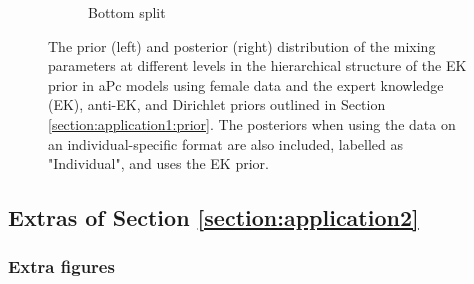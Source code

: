 \begin{figure}[h]
\begin{subfigure}[b]{0.8\textwidth}
        \caption[]%
        {{\small  Bottom split}}    
        \label{figure:INDI:s3_f}
    \end{subfigure}
    \vspace{-0.2cm}
    \caption{The prior (left) and posterior (right) distribution of the mixing parameters at different levels in the hierarchical structure of the EK prior in aPc models using female data and the expert knowledge (EK), anti-EK, and Dirichlet priors outlined in Section \ref{section:application1:prior}. The posteriors when using the data on an individual-specific format are also included, labelled as "Individual", and uses the EK prior.}
    \label{figure:INDI:compare-plots_f}
\end{figure}

\FloatBarrier
\subsection{Extras of Section \ref{section:application2}}
\label{appendix:application2}
\subsubsection{Extra figures}


